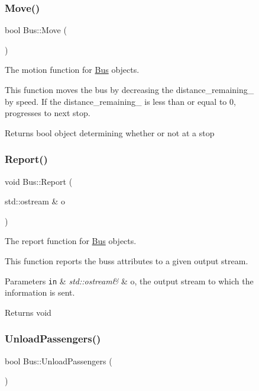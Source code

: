 \begin{figure}[H]
\begin{center}
\subsubsection{\texorpdfstring{Move()}{Move()}}
{\footnotesize\ttfamily bool Bus\+::\+Move (\begin{DoxyParamCaption}{ }\end{DoxyParamCaption})}



The motion function for \hyperlink{classBus}{Bus} objects. 

This function moves the bus by decreasing the distance\+\_\+remaining\+\_\+ by speed. If the distance\+\_\+remaining\+\_\+ is less than or equal to 0, progresses to next stop.

\begin{DoxyReturn}{Returns}
bool object determining whether or not at a stop 
\end{DoxyReturn}
\mbox{\label{classBus_a695e790984f5cf7bbec85fe422466b48}} 
\subsubsection{\texorpdfstring{Report()}{Report()}}
{\footnotesize\ttfamily void Bus\+::\+Report (\begin{DoxyParamCaption}\item[{std\+::ostream \&}]{o }\end{DoxyParamCaption})}



The report function for \hyperlink{classBus}{Bus} objects. 

This function reports the bus\textquotesingle{}s attributes to a given output stream.


\begin{DoxyParams}[1]{Parameters}
\mbox{\tt in}  & {\em std\+::ostream\&} & o, the output stream to which the information is sent.\\
\hline
\end{DoxyParams}
\begin{DoxyReturn}{Returns}
void 
\end{DoxyReturn}
\mbox{\label{classBus_a352bd5f926705ed4dd91d7fdea6a7fc9}} 
\subsubsection{\texorpdfstring{Unload\+Passengers()}{UnloadPassengers()}}
{\footnotesize\ttfamily bool Bus\+::\+Unload\+Passengers (\begin{DoxyParamCaption}{ }\end{DoxyParamCaption})}




\end{center}
\end{figure}

